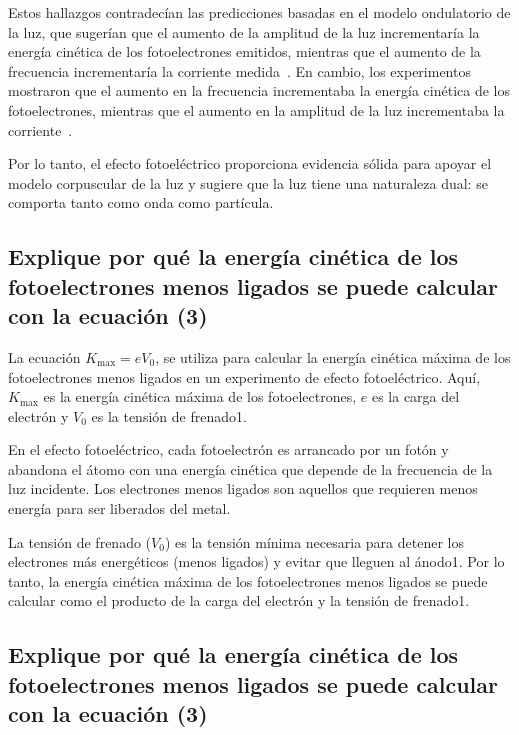 \documentclass[twocolumn, 12pt]{article}
\begin{document}
Estos hallazgos contradecían las predicciones basadas en el
modelo ondulatorio de la luz, que sugerían que el aumento
de la amplitud de la luz incrementaría la energía cinética
de los fotoelectrones emitidos, mientras que el aumento de
la frecuencia incrementaría la corriente
medida~\cite{cite_3}. En cambio, los experimentos mostraron
que el aumento en la frecuencia incrementaba la energía
cinética de los fotoelectrones, mientras que el aumento en
la amplitud de la luz incrementaba la
corriente~\cite{cite_3}.

Por lo tanto, el efecto fotoeléctrico proporciona evidencia
sólida para apoyar el modelo corpuscular de la luz y
sugiere que la luz tiene una naturaleza dual: se comporta
tanto como onda como partícula.

\subsection*{Explique por qué la energía cinética de los fotoelectrones menos ligados se puede
      calcular con la ecuación (3)}

La ecuación $K_{\max}= e V_0$, se utiliza para calcular la
energía cinética máxima de los fotoelectrones menos ligados
en un experimento de efecto fotoeléctrico. Aquí, $K_{\max}$
es la energía cinética máxima de los fotoelectrones, $e$ es
la carga del electrón y $V_0$ es la tensión de frenado1.

En el efecto fotoeléctrico, cada fotoelectrón es arrancado
por un fotón y abandona el átomo con una energía cinética
que depende de la frecuencia de la luz incidente. Los
electrones menos ligados son aquellos que requieren menos
energía para ser liberados del metal.

La tensión de frenado ($V_0$) es la tensión mínima
necesaria para detener los electrones más energéticos
(menos ligados) y evitar que lleguen al ánodo1. Por lo
tanto, la energía cinética máxima de los fotoelectrones
menos ligados se puede calcular como el producto de la
carga del electrón y la tensión de frenado1.

\subsection*{Explique por qué la energía cinética de los fotoelectrones menos ligados se puede
      calcular con la ecuación (3)}
\end{document}
